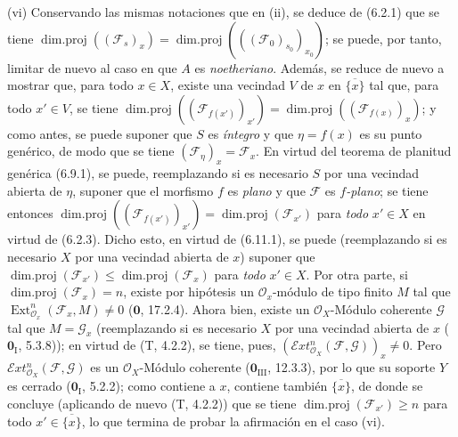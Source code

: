 (vi) Conservando las mismas notaciones que en (ii), se deduce de (6.2.1) que se
tiene
$\operatorname{dim.proj}((\mathcal F_s)_x)=
\operatorname{dim.proj}(((\mathcal F_0)_{s_0})_{x_0})$;
se puede, por tanto, limitar de nuevo al caso en que $A$ es \emph{noetheriano}. Además,
se reduce de nuevo a mostrar que, para todo $x\in X$, existe una vecindad $V$
de $x$ en $\overline{\{x\}}$ tal que, para todo $x'\in V$, se tiene
$\operatorname{dim.proj}((\mathcal F_{f(x')})_{x'})=
\operatorname{dim.proj}((\mathcal F_{f(x)})_x)$;
y como antes, se puede suponer que $S$ es \emph{íntegro} y que
$\eta=f(x)$ es su punto genérico, de modo que se tiene
$(\mathcal F_\eta)_x=\mathcal F_x$. En virtud del teorema de planitud genérica
(6.9.1), se puede, reemplazando si es necesario $S$ por una vecindad abierta de
$\eta$, suponer que el morfismo $f$ es \emph{plano} y que $\mathcal F$ es
\emph{$f$-plano}; se tiene entonces
$\operatorname{dim.proj}((\mathcal F_{f(x')})_{x'})=
\operatorname{dim.proj}(\mathcal F_{x'})$ para \emph{todo} $x'\in X$ en virtud de
(6.2.3). Dicho esto, en virtud de (6.11.1), se puede (reemplazando si es necesario $X$
por una vecindad abierta de $x$) suponer que
$\operatorname{dim.proj}(\mathcal F_{x'})\leq
\operatorname{dim.proj}(\mathcal F_x)$ para \emph{todo} $x'\in X$. Por otra parte, si
$\operatorname{dim.proj}(\mathcal F_x)=n$, existe por hipótesis un
$\mathcal O_x$-módulo de tipo finito $M$ tal que
$\operatorname{Ext}_{\mathcal O_x}^n(\mathcal F_x,M)\neq0$
($\mathbf 0$, 17.2.4). Ahora bien, existe un $\mathcal O_X$-Módulo coherente
$\mathcal G$ tal que $M=\mathcal G_x$ (reemplazando si es necesario $X$ por una
vecindad abierta de $x$ ($\mathbf 0_{\mathrm I}$, 5.3.8)); en virtud de
(T, 4.2.2), se tiene, pues,
$(\mathcal{E}xt_{\mathcal O_X}^n(\mathcal F,\mathcal G))_x\neq0$. Pero
$\mathcal{E}xt_{\mathcal O_X}^n(\mathcal F,\mathcal G)$ es un
$\mathcal O_X$-Módulo coherente ($\mathbf 0_{\mathrm{III}}$, 12.3.3), por lo que su
soporte $Y$ es cerrado ($\mathbf 0_{\mathrm I}$, 5.2.2); como contiene a $x$,
contiene también $\overline{\{x\}}$, de donde se concluye (aplicando de nuevo
(T, 4.2.2)) que se tiene
$\operatorname{dim.proj}(\mathcal F_{x'})\geq n$ para todo
$x'\in\overline{\{x\}}$, lo que termina de probar la afirmación en el caso (vi).

